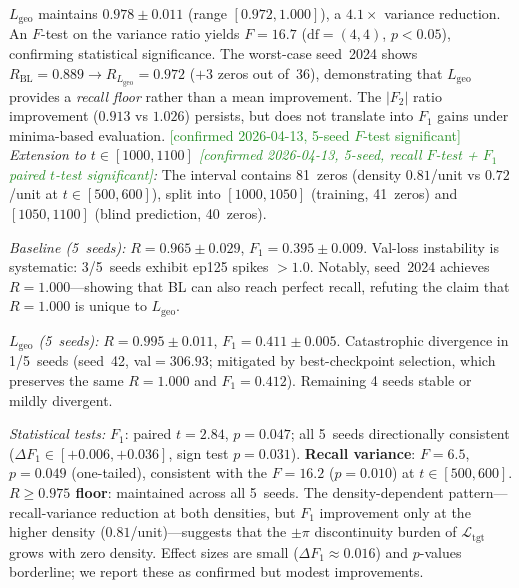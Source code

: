 \documentclass[11pt, a4paper]{article}
\theoremstyle{definition}
\theoremstyle{plain}
\newcommand{\Ltgt}{\mathcal{L}_{\mathrm{tgt}}}
\begin{document}
\begin{itemize}
        $L_{\mathrm{geo}}$ maintains $0.978\pm0.011$
        (range $[0.972,1.000]$), a $4.1\times$ variance reduction.
        An $F$-test on the variance ratio yields
        $F=16.7$ ($\mathrm{df}=(4,4)$, $p<0.05$), confirming
        statistical significance.
        The worst-case seed~2024 shows
        $R_{\mathrm{BL}}=0.889\to R_{L_{\mathrm{geo}}}=0.972$
        ($+3$ zeros out of~36), demonstrating that
        $L_{\mathrm{geo}}$ provides a \emph{recall floor}
        rather than a mean improvement.
        The $|F_2|$ ratio improvement ($0.913$ vs $1.026$) persists,
        but does not translate into $F_1$ gains under minima-based
        evaluation.
        \textcolor{ForestGreen}{[confirmed 2026-04-13, 5-seed
        $F$-test significant]}
        \emph{Extension to $t\in[1000{,}1100]$
        \textcolor{ForestGreen}{[confirmed 2026-04-13, 5-seed,
        recall $F$-test + $F_1$ paired $t$-test significant]}:}
        The interval contains 81~zeros (density $0.81$/unit vs
        $0.72$/unit at $t\in[500,600]$), split into
        $[1000,1050]$ (training, 41~zeros) and $[1050,1100]$
        (blind prediction, 40~zeros).

        \smallskip\noindent
        \emph{Baseline (5~seeds):}
        $R{=}0.965\pm0.029$, $F_1{=}0.395\pm0.009$.
        Val-loss instability is systematic: 3/5~seeds exhibit
        ep125 spikes $>1.0$.
        Notably, seed~2024 achieves $R{=}1.000$---showing that
        BL can also reach perfect recall, refuting the claim
        that $R{=}1.000$ is unique to $L_{\mathrm{geo}}$.

        \smallskip\noindent
        \emph{$L_{\mathrm{geo}}$ (5~seeds):}
        $R{=}0.995\pm0.011$, $F_1{=}0.411\pm0.005$.
        Catastrophic divergence in 1/5~seeds (seed~42,
        val$=306.93$; mitigated by best-checkpoint selection,
        which preserves the same $R{=}1.000$ and $F_1{=}0.412$).
        Remaining 4 seeds stable or mildly divergent.

        \smallskip\noindent
        \emph{Statistical tests:}
        \textbf{$F_1$}: paired $t{=}2.84$, $p{=}0.047$; all 5~seeds
        directionally consistent ($\Delta F_1 \in [+0.006, +0.036]$,
        sign test $p{=}0.031$).
        \textbf{Recall variance}: $F{=}6.5$, $p{=}0.049$
        (one-tailed), consistent with the $F{=}16.2$ ($p{=}0.010$)
        at $t\in[500,600]$.
        \textbf{$R{\ge}0.975$ floor}: maintained across all 5~seeds.
        The density-dependent pattern---recall-variance reduction at
        both densities, but $F_1$ improvement only at the higher
        density ($0.81$/unit)---suggests that the $\pm\pi$
        discontinuity burden of $\Ltgt$ grows with zero density.
        Effect sizes are small ($\Delta F_1 \approx 0.016$) and
        $p$-values borderline; we report these as confirmed but
        modest improvements.
\end{itemize}
\end{document}
